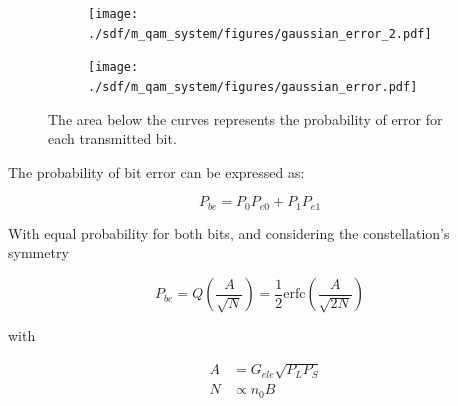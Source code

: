 \begin{figure}[H]
	\centering
	\begin{subfigure}{.5\textwidth}
		\centering
		\texttt{[image: ./sdf/m\_qam\_system/figures/gaussian\_error\_2.pdf]}
	\end{subfigure}%
	\begin{subfigure}{.5\textwidth}
		\centering
		\texttt{[image: ./sdf/m\_qam\_system/figures/gaussian\_error.pdf]}
	\end{subfigure}
	\caption{The area below the curves represents the probability of error for each transmitted bit.}
	\label{fig:gausserr}
\end{figure}

The probability of bit error can be expressed as:

\begin{equation}
P_{be} = P_0 P_{e0} + P_1 P_{e1}
\end{equation}

With equal probability for both bits, and considering the constellation's symmetry

\begin{equation}\label{eq:berMQAM}
P_{be} =  Q\left({\frac{A}{\sqrt{N}}}\right) = \frac{1}{2} \text{erfc}\left({\frac{A}{\sqrt{2 N}}}\right) 
\end{equation}





with


\begin{eqnarray}
&A &= G_{ele} \sqrt{P_L P_S}\label{eq:bpskamplitude}\\
&N &\propto n_0 B
\end{eqnarray}

